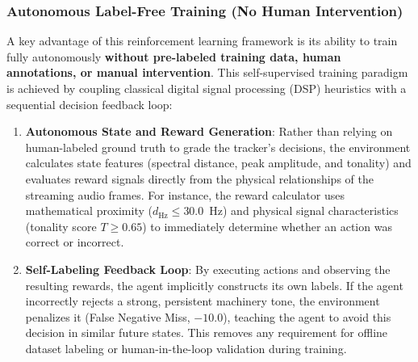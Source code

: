 \documentclass[12pt,a4paper]{article}
\begin{document}
\subsubsection{Autonomous Label-Free Training (No Human Intervention)}
A key advantage of this reinforcement learning framework is its ability to train fully autonomously \textbf{without pre-labeled training data, human annotations, or manual intervention}. This self-supervised training paradigm is achieved by coupling classical digital signal processing (DSP) heuristics with a sequential decision feedback loop:
\begin{enumerate}
    \item \textbf{Autonomous State and Reward Generation}: Rather than relying on human-labeled ground truth to grade the tracker's decisions, the environment calculates state features (spectral distance, peak amplitude, and tonality) and evaluates reward signals directly from the physical relationships of the streaming audio frames. For instance, the reward calculator uses mathematical proximity ($d_{\text{Hz}} \le 30.0$~Hz) and physical signal characteristics (tonality score $T \ge 0.65$) to immediately determine whether an action was correct or incorrect.
    \item \textbf{Self-Labeling Feedback Loop}: By executing actions and observing the resulting rewards, the agent implicitly constructs its own labels. If the agent incorrectly rejects a strong, persistent machinery tone, the environment penalizes it (False Negative Miss, $-10.0$), teaching the agent to avoid this decision in similar future states. This removes any requirement for offline dataset labeling or human-in-the-loop validation during training.
\end{enumerate}
\end{document}
